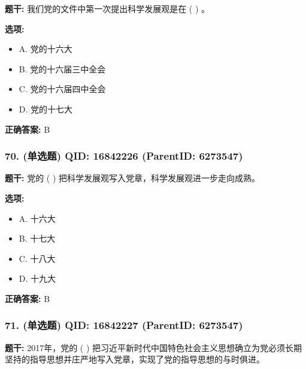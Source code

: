 \documentclass[12pt,UTF8]{ctexart}
\begin{document}
\textbf{题干:}
我们党的文件中第一次提出科学发展观是在 ( ) 。



\textbf{选项:}
\begin{itemize}[leftmargin=*]

  \item A. 党的十六大

  \item B. 党的十六届三中全会

  \item C. 党的十六届四中全会

  \item D. 党的十七大

\end{itemize}

\textbf{正确答案:}
B

\vspace{0.3em}\hrulefill\vspace{0.7em}

\subsubsection*{70. (单选题) \small QID: 16842226 (ParentID: 6273547)}

\textbf{题干:}
党的 ( ) 把科学发展观写入党章，科学发展观进一步走向成熟。



\textbf{选项:}
\begin{itemize}[leftmargin=*]

  \item A. 十六大

  \item B. 十七大

  \item C. 十八大

  \item D. 十九大

\end{itemize}

\textbf{正确答案:}
B

\vspace{0.3em}\hrulefill\vspace{0.7em}

\subsubsection*{71. (单选题) \small QID: 16842227 (ParentID: 6273547)}

\textbf{题干:}
2017年，党的 ( ) 把习近平新时代中国特色社会主义思想确立为党必须长期坚持的指导思想并庄严地写入党章，实现了党的指导思想的与时俱进。
\end{document}
